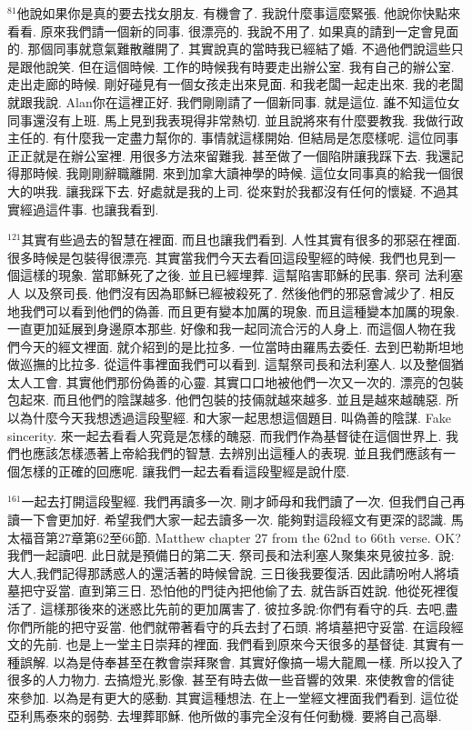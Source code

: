 \documentclass{book}
\begin{document}
$^{81}$他說如果你是真的要去找女朋友.
有機會了.
我說什麼事這麼緊張.
他說你快點來看看.
原來我們請一個新的同事.
很漂亮的.
我說不用了.
如果真的請到一定會見面的.
那個同事就意氣難散離開了.
其實說真的當時我已經結了婚.
不過他們說這些只是跟他說笑.
但在這個時候.
工作的時候我有時要走出辦公室.
我有自己的辦公室.
走出走廊的時候.
剛好碰見有一個女孩走出來見面.
和我老闆一起走出來.
我的老闆就跟我說.
Alan你在這裡正好.
我們剛剛請了一個新同事.
就是這位.
誰不知這位女同事還沒有上班.
馬上見到我表現得非常熱切.
並且說將來有什麼要教我.
我做行政主任的.
有什麼我一定盡力幫你的.
事情就這樣開始.
但結局是怎麼樣呢.
這位同事正正就是在辦公室裡.
用很多方法來留難我.
甚至做了一個陷阱讓我踩下去.
我還記得那時候.
我剛剛辭職離開.
來到加拿大讀神學的時候.
這位女同事真的給我一個很大的哄我.
讓我踩下去.
好處就是我的上司.
從來對於我都沒有任何的懷疑.
不過其實經過這件事.
也讓我看到.

$^{121}$其實有些過去的智慧在裡面.
而且也讓我們看到.
人性其實有很多的邪惡在裡面.
很多時候是包裝得很漂亮.
其實當我們今天去看回這段聖經的時候.
我們也見到一個這樣的現象.
當耶穌死了之後.
並且已經埋葬.
這幫陷害耶穌的民事.
祭司 法利塞人 以及祭司長.
他們沒有因為耶穌已經被殺死了.
然後他們的邪惡會減少了.
相反地我們可以看到他們的偽善.
而且更有變本加厲的現象.
而且這種變本加厲的現象.
一直更加延展到身邊原本那些.
好像和我一起同流合污的人身上.
而這個人物在我們今天的經文裡面.
就介紹到的是比拉多.
一位當時由羅馬去委任.
去到巴勒斯坦地做巡撫的比拉多.
從這件事裡面我們可以看到.
這幫祭司長和法利塞人.
以及整個猶太人工會.
其實他們那份偽善的心靈.
其實口口地被他們一次又一次的.
漂亮的包裝包起來.
而且他們的陰謀越多.
他們包裝的技倆就越來越多.
並且是越來越醜惡.
所以為什麼今天我想透過這段聖經.
和大家一起思想這個題目.
叫偽善的陰謀.
Fake sincerity.
來一起去看看人究竟是怎樣的醜惡.
而我們作為基督徒在這個世界上.
我們也應該怎樣憑著上帝給我們的智慧.
去辨別出這種人的表現.
並且我們應該有一個怎樣的正確的回應呢.
讓我們一起去看看這段聖經是說什麼.

$^{161}$一起去打開這段聖經.
我們再讀多一次.
剛才師母和我們讀了一次.
但我們自己再讀一下會更加好.
希望我們大家一起去讀多一次.
能夠對這段經文有更深的認識.
馬太福音第27章第62至66節.
Matthew chapter 27 from the 62nd to 66th verse.
OK?我們一起讀吧.
此日就是預備日的第二天.
祭司長和法利塞人聚集來見彼拉多.
說:大人,我們記得那誘惑人的還活著的時候曾說.
三日後我要復活.
因此請吩咐人將墳墓把守妥當.
直到第三日.
恐怕他的門徒內把他偷了去.
就告訴百姓說.
他從死裡復活了.
這樣那後來的迷惑比先前的更加厲害了.
彼拉多說:你們有看守的兵.
去吧,盡你們所能的把守妥當.
他們就帶著看守的兵去封了石頭.
將墳墓把守妥當.
在這段經文的先前.
也是上一堂主日崇拜的裡面.
我們看到原來今天很多的基督徒.
其實有一種誤解.
以為是侍奉甚至在教會崇拜聚會.
其實好像搞一場大龍鳳一樣.
所以投入了很多的人力物力.
去搞燈光,影像.
甚至有時去做一些音響的效果.
來使教會的信徒來參加.
以為是有更大的感動.
其實這種想法.
在上一堂經文裡面我們看到.
這位從亞利馬泰來的弱勢.
去埋葬耶穌.
他所做的事完全沒有任何動機.
要將自己高舉.
\end{document}
